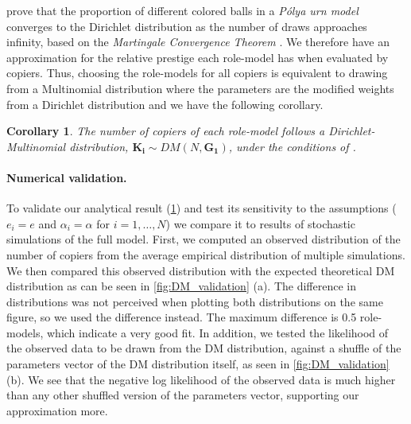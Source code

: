 \documentclass[12pt]{extarticle}
\let\vec\mathbf
\newtheorem{corollary}{Corollary}
\begin{document}
\citet[section 2]{dirichlet} prove that the proportion of different colored balls in a \textit{P\'{o}lya urn model} converges to the Dirichlet distribution as the number of draws approaches infinity, based on the \textit{Martingale Convergence Theorem} \citep{martingaleBook}.
We therefore have an approximation for the relative prestige each role-model has when evaluated by copiers. Thus, choosing the role-models for all copiers is equivalent to drawing from a Multinomial distribution where the parameters are the modified weights from a Dirichlet distribution and we have the following corollary.
\\

\begin{corollary}\label{cor:dirichlet}
The number of copiers of each role-model follows a Dirichlet-Multinomial distribution, $\vec{K_i} \sim \textit{DM}(N,\vec{G_1})$, under the conditions of .
\end{corollary}

\paragraph{Numerical validation.}
To validate our analytical result (\cref{cor:dirichlet}) and test its sensitivity to the assumptions ($e_i=e$ and $\alpha_i=\alpha$ for $i=1,\ldots,N$) we compare it to results of stochastic simulations of the full model.
First, we computed an observed distribution of the number of copiers from the average empirical distribution of multiple simulations.
We then compared this observed distribution with the expected theoretical DM distribution as can be seen in \cref{fig:DM_validation} (a). The difference in distributions was not perceived when plotting both distributions on the same figure, so we used the difference instead. The maximum difference is 0.5 role-models, which indicate a very good fit.
In addition, we tested the likelihood of the observed data to be drawn from the DM distribution, against a shuffle of the parameters vector of the DM distribution itself, as seen in \cref{fig:DM_validation} (b). We see that the negative log likelihood of the observed data is much higher than any other shuffled version of the parameters vector, supporting our approximation more.
\end{document}
